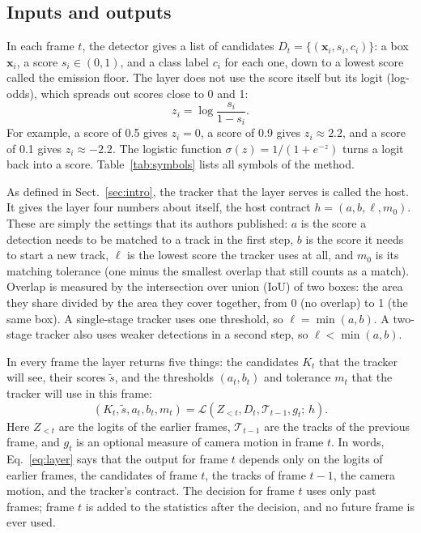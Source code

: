 \documentclass[pdflatex,sn-mathphys-num,iicol]{sn-jnl}
\begin{document}
\subsection{Inputs and outputs}\label{sec:problem}
In each frame $t$, the detector gives a list of candidates
$D_t=\{(\mathbf{x}_i,s_i,c_i)\}$: a box $\mathbf{x}_i$, a score
$s_i\in(0,1)$, and a class label $c_i$ for each one, down to a lowest score
called the emission floor. The layer does not use the score itself but its
logit (log-odds), which spreads out scores close to 0 and 1:
\begin{equation}
z_i=\log\frac{s_i}{1-s_i}.
\label{eq:logit}
\end{equation}
For example, a score of 0.5 gives $z_i=0$, a score of 0.9 gives
$z_i\approx2.2$, and a score of 0.1 gives $z_i\approx-2.2$. The logistic
function $\sigma(z)=1/(1+e^{-z})$ turns a logit back into a score. Table~\ref{tab:symbols}
lists all symbols of the method.

As defined in Sect.~\ref{sec:intro}, the tracker that the layer serves is
called the host. It gives the layer four numbers about itself, the host
contract $h=(a,b,\ell,m_0)$. These are simply the settings that its
authors published: $a$ is the score a detection needs to be matched to a
track in the first step, $b$ is the score it needs to start a new track,
$\ell$ is the lowest score the tracker uses at all, and $m_0$ is its matching
tolerance (one minus the smallest overlap that still counts as a match).
Overlap is measured by the intersection over union (IoU) of two boxes: the
area they share divided by the area they cover together, from 0 (no overlap)
to 1 (the same box). A
single-stage tracker uses one threshold, so $\ell=\min(a,b)$. A two-stage
tracker also uses weaker detections in a second step, so
$\ell<\min(a,b)$.

In every frame the layer returns five things: the candidates $K_t$ that the
tracker will see, their scores $\tilde{s}$, and the thresholds $(a_t,b_t)$
and tolerance $m_t$ that the tracker will use in this frame:
\begin{equation}
\left(K_t,\tilde{s},a_t,b_t,m_t\right)=
\mathcal{L}\left(Z_{<t},D_t,\mathcal{T}_{t-1},g_t;\,h\right).
\label{eq:layer}
\end{equation}
Here $Z_{<t}$ are the logits of the earlier frames, $\mathcal{T}_{t-1}$ are
the tracks of the previous frame, and $g_t$ is an optional measure of camera
motion in frame $t$. In words, Eq.~\eqref{eq:layer} says that the output for
frame $t$ depends only on the logits of earlier frames, the candidates of
frame $t$, the tracks of frame $t-1$, the camera motion, and the tracker's
contract. The decision for frame $t$ uses only past frames; frame $t$ is
added to the statistics after the decision, and no future frame is ever
used.
\end{document}
